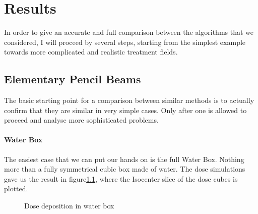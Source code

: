 \documentclass[12pt, a4paper, twoside]{book}
\begin{document}
\chapter{Results} %
\label{chap:res}



In order to give an accurate and full comparison between the algorithms that we considered, I will proceed by several steps, starting from the simplest example towards more complicated and realistic treatment fields.




\section{Elementary Pencil Beams}
The basic starting point for a comparison between similar methods is to actually confirm that they are similar in very simple cases. Only after one is allowed to proceed and analyse more sophisticated problems. 

\subsubsection{Water Box}
The easiest case that we can put our hands on is the full Water Box. Nothing more than a fully symmetrical cubic box made of water.
The dose simulations gave us the result in figure\ref{fig:WB1}, where the Isocenter slice of the dose cubes is plotted.
\begin{figure}[!ht]
\centering
{}
\caption{Dose deposition in water box}
\label{fig:WB1}
\end{figure}
\end{document}
